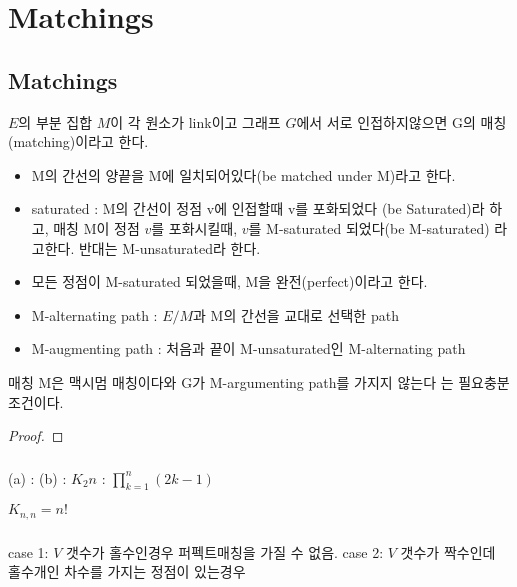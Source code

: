 \section{Matchings}

\subsection{Matchings}

\begin{dfn}[Matching]

    $E$의 부분 집합 $M$이 각 원소가 link이고 그래프 $G$에서 서로 인접하지않으면 G의 매칭(matching)이라고 한다.

    
    
    \begin{itemize}
        \item M의 간선의 양끝을 M에 일치되어있다(be matched under M)라고 한다.
        \item saturated : M의 간선이 정점 v에 인접할때 v를 포화되었다 (be Saturated)라 하고, 매칭 M이 정점 $v$를 포화시킬때, $v$를 M-saturated 되었다(be M-saturated) 라고한다. 반대는 M-unsaturated라 한다.
        \item 모든 정점이 M-saturated 되었을때, M을 완전(perfect)이라고 한다.
        \item M-alternating path : $E/M$과 M의 간선을 교대로 선택한 path
        \item M-augmenting path : 처음과 끝이 M-unsaturated인 M-alternating path
    \end{itemize}


\end{dfn}

\begin{theorem} 매칭 M은 맥시멈 매칭이다와 G가 M-argumenting path를 가지지 않는다 는 필요충분 조건이다.
    
\end{theorem}

\begin{proof}
    
\end{proof}

\subsubsection{}
(a) :
(b) : 
$K_2n$ : $\prod_{k=1}^{n} (2k-1)$

$K_{n,n} = n!$
\subsubsection{}
case 1: $V$ 갯수가 홀수인경우 퍼펙트매칭을 가질 수 없음.
case 2: $V$ 갯수가 짝수인데 홀수개인 차수를 가지는 정점이 있는경우
\subsubsection{}
\subsubsection{}

\subsubsection{}
